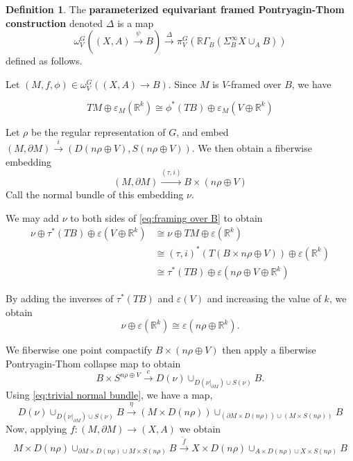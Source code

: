 \documentclass[11pt]{amsart}
\newcommand{\R}{\mathbb R}
\theoremstyle{plain}   %
\theoremstyle{definition}
\newtheorem{df}[thm]{Definition}
\theoremstyle{remark}
\numberwithin{equation}{section}
\begin{document}
\begin{df}\label{df:parameterized equivariant framed PT}
The \textbf{parameterized equivariant framed Pontryagin-Thom construction} denoted $\Delta$ is a map
\[
\omega_{V}^G((X,A)\xrightarrow{\psi} B) \xrightarrow{\Delta} \pi_V^G\left( \R\Gamma_B(\Sigma_B^\infty X\cup_A B) \right)
\]
defined as follows.

Let $(M,f,\phi)\in \omega_{V}^G((X,A)\to B)$. Since $M$ is $V$-framed over $B$, we have
 
\begin{equation}\label{eq:framing over B}
TM\oplus\varepsilon_M(\R^{k})\cong \phi^*(TB)\oplus\varepsilon_M(V\oplus\R^k)
\end{equation}

Let $\rho$ be the regular representation of $G$, and embed $(M,\partial M)\xrightarrow{i} (D(n\rho\oplus V),S(n\rho\oplus V))$. We then obtain a fiberwise embedding
\[
(M,\partial M)\xrightarrow{(\tau,i)} B\times(n\rho\oplus V)
\]
Call the normal bundle of this embedding $\nu$.

We may add $\nu$ to both sides of \cref{eq:framing over B} to obtain
\begin{align*}
\nu\oplus \tau^*(TB)\oplus \varepsilon(V\oplus\R^k)
& \cong \nu\oplus TM\oplus\varepsilon(\R^{k})\\
& \cong (\tau,i)^*(T(B\times n\rho\oplus V))\oplus\varepsilon(\R^{k})\\
& \cong \tau^*(TB)\oplus \varepsilon(n\rho\oplus V\oplus \R^{k})
\end{align*}

By adding the inverses of $\tau^*(TB)$ and $\varepsilon(V)$ and increasing the value of $k$, we obtain
\begin{equation}\label{eq:trivial normal bundle}
\nu\oplus\varepsilon(\R^k)\cong \varepsilon(n\rho\oplus\R^{k}).
\end{equation}

We fiberwise one point compactify $B\times(n\rho\oplus V)$ then apply a fiberwise Pontryagin-Thom collapse map to obtain
\[
B\times S^{n\rho\oplus V} \xrightarrow{c} D(\nu)\cup_{D(\nu|_{\partial M})\cup S(\nu)}B.
\]
Using \cref{eq:trivial normal bundle}, we have a map,
\[
D(\nu)\cup_{D(\nu|_{\partial M})\cup S(\nu)}B \xrightarrow{\eta} (M\times D(n\rho))\cup_{(\partial M\times D(n\rho))\cup (M\times S(n\rho))}B
\]
Now, applying $f:(M,\partial M)\to (X,A)$ we obtain
\[
 M\times D(n\rho)\cup_{\partial M\times D(n\rho)\cup M\times S(n\rho)}B \xrightarrow{\tilde{f}}  X\times D(n\rho)\cup_{A\times D(n\rho)\cup X\times S(n\rho)}B
\]


\end{df}
\end{document}
